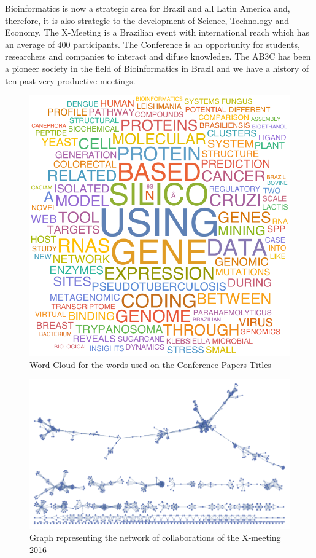 	
Bioinformatics is now a strategic area for Brazil and all Latin America and,
therefore, it is also strategic to the development of Science, Technology and
Economy. The X-Meeting is a Brazilian event with international reach which has
an average of 400 participants. The Conference is an opportunity for students,
researchers and companies to interact and difuse knowledge. The AB3C has been a
pioneer society in the field of Bioinformatics in Brazil and we have a history
of ten past very productive meetings.

\begin{figure}[h]
    \begin{center}
  \includegraphics[scale=0.7]{wordcloud}
\end{center}
\caption{Word Cloud for the words used on the Conference Papers Titles}
\end{figure}



\begin{figure}[h]
    \begin{center}
  \includegraphics[scale=0.7]{grafo}
\end{center}
\caption{Graph representing the network of collaborations of the X-meeting 2016}
\end{figure}